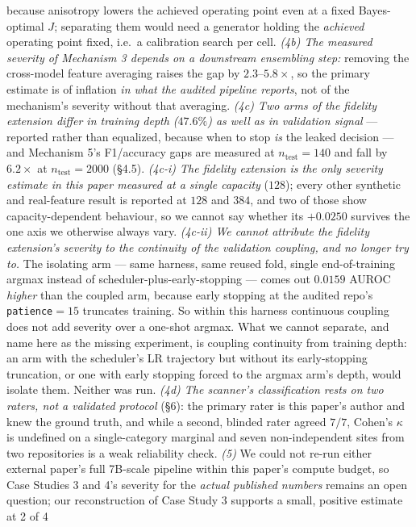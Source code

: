 \documentclass[10pt]{article} %
\begin{document}
because anisotropy lowers the achieved operating point even at a fixed
Bayes-optimal $J$; separating them would need a generator holding the
\emph{achieved} operating point fixed, i.e.\ a calibration search per cell.
\emph{(4b) The measured severity of Mechanism 3 depends on a downstream
ensembling step:} removing the cross-model feature averaging raises the gap by
$2.3$--$5.8\times$, so the primary estimate is of inflation \emph{in what the
audited pipeline reports}, not of the mechanism's severity without that
averaging. \emph{(4c) Two arms of the fidelity extension differ in training
depth ($47.6\%$) as well as in validation signal} --- reported rather than
equalized, because when to stop \emph{is} the leaked decision --- and
Mechanism 5's F1/accuracy gaps are measured at $n_{\text{test}}=140$ and fall
by $6.2\times$ at $n_{\text{test}}=2000$ (§4.5).
\emph{(4c-i) The fidelity extension is the only severity estimate in this paper
measured at a single capacity} ($128$); every other synthetic and real-feature
result is reported at $128$ and $384$, and two of those show capacity-dependent
behaviour, so we cannot say whether its $+0.0250$ survives the one axis we
otherwise always vary.
\emph{(4c-ii) We cannot attribute the fidelity extension's severity to the
\emph{continuity} of the validation coupling, and no longer try to.} The
isolating arm --- same harness, same reused fold, single end-of-training argmax
instead of scheduler-plus-early-stopping --- comes out $0.0159$ AUROC
\emph{higher} than the coupled arm, because early stopping at the audited
repo's \texttt{patience}$=15$ truncates training. So within this harness
continuous coupling does not add severity over a one-shot argmax. What we
cannot separate, and name here as the missing experiment, is coupling
continuity from training depth: an arm with the scheduler's LR trajectory but
without its early-stopping truncation, or one with early stopping forced to the
argmax arm's depth, would isolate them. Neither was run. \emph{(4d) The scanner's
classification rests on two raters, not a validated protocol} (§6): the primary
rater is this paper's author and knew the ground truth, and while a second,
blinded rater agreed $7/7$, Cohen's $\kappa$ is undefined on a single-category
marginal and seven non-independent sites from two repositories is a weak
reliability check. \emph{(5)} We could not re-run either external paper's full
7B-scale pipeline within this paper's compute budget, so Case Studies 3 and 4's
severity for the \emph{actual published numbers} remains an open question; our
reconstruction of Case Study 3 supports a small, positive estimate at 2 of 4
\end{document}
